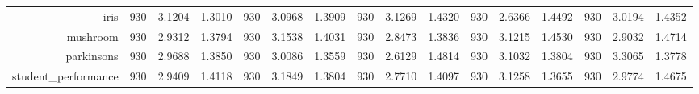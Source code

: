 \begin{table}[htbp]
{\begin{tabular}{rccccccccccccccc}
			iris                                & 930                                     & 3.1204                                                                    & 1.3010          & 930                            & 3.0968                                                                    & 1.3909          & 930                             & 3.1269                                                                             & 1.4320          & 930                             & \cellcolor[rgb]{ .776,  .937,  .808}\textcolor[rgb]{ 0,  .38,  0}{2.6366} & 1.4492          & 930                             & 3.0194                                                                    & 1.4352          \\
			mushroom                            & 930                                     & 2.9312                                                                    & 1.3794          & 930                            & 3.1538                                                                    & 1.4031          & 930                             & \cellcolor[rgb]{ .776,  .937,  .808}\textcolor[rgb]{ 0,  .38,  0}{2.8473}          & 1.3836          & 930                             & 3.1215                                                                    & 1.4530          & 930                             & 2.9032                                                                    & 1.4714          \\
			parkinsons                          & 930                                     & 2.9688                                                                    & 1.3850          & 930                            & 3.0086                                                                    & 1.3559          & 930                             & \cellcolor[rgb]{ .776,  .937,  .808}\textcolor[rgb]{ 0,  .38,  0}{2.6129}          & 1.4814          & 930                             & 3.1032                                                                    & 1.3804          & 930                             & 3.3065                                                                    & 1.3778          \\
			student\_performance                & 930                                     & 2.9409                                                                    & 1.4118          & 930                            & 3.1849                                                                    & 1.3804          & 930                             & \cellcolor[rgb]{ .776,  .937,  .808}\textcolor[rgb]{ 0,  .38,  0}{2.7710}          & 1.4097          & 930                             & 3.1258                                                                    & 1.3655          & 930                             & 2.9774                                                                    & 1.4675          \\

\end{tabular}}
\end{table}
